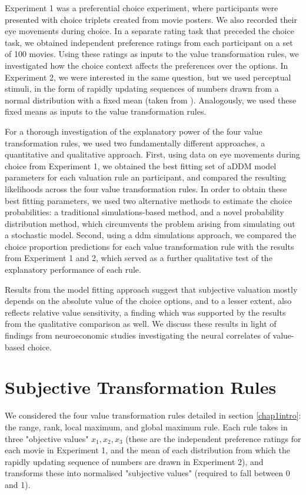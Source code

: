 \documentclass[11pt,a4paper]{article}
\begin{document}
Experiment 1 was a preferential choice experiment, where participants were presented with choice triplets created from movie posters. We also recorded their eye movements during choice. In a separate rating task that preceded the choice task, we obtained independent preference ratings from each participant on a set of 100 movies. Using these ratings as inputs to the value transformation rules, we investigated how the choice context affects the preferences over the options. In Experiment 2, we were interested in the same question, but we used perceptual stimuli, in the form of rapidly updating sequences of numbers drawn from a normal distribution with a fixed mean (taken from ). Analogously, we used these fixed means as inputs to the value transformation rules.


For a thorough investigation of the explanatory power of the four value transformation rules, we used two fundamentally different approaches, a quantitative and qualitative approach. First, using data on eye movements during choice from Experiment 1, we obtained the best fitting set of aDDM model parameters for each valuation rule an participant, and compared the resulting likelihoods across the four value transformation rules. In order to obtain these best fitting parameters, we used two alternative methods to estimate the choice probabilities: a traditional simulations-based method, and a novel probability distribution method, which circumvents the problem arising from simulating out a stochastic model. Second, using a ddm simulations approach, we compared the choice proportion predictions for each value transformation rule with the results from Experiment 1 and 2, which served as a further qualitative test of the explanatory performance of each rule. 

Results from the model fitting approach suggest that subjective valuation mostly depends on the absolute value of the choice options, and to a lesser extent, also reflects  relative value sensitivity, a finding which was supported by the results from the qualitative comparison as well. We discuss these results in light of findings from neuroeconomic studies investigating the neural correlates of value-based choice.

\section{Subjective Transformation Rules} \label{chap1subjtrexplained}

We considered the four value transformation rules detailed in section \ref{chap1intro}: the range, rank, local maximum, and global maximum rule. Each rule takes in three "objective values" $x_1, x_2, x_3$  (these are the independent preference ratings for each movie in Experiment 1, and the mean of each distribution from which the rapidly updating sequence of numbers are drawn in Experiment 2), and transforms these into normalised "subjective values" (required to fall between 0 and 1). 
\end{document}
